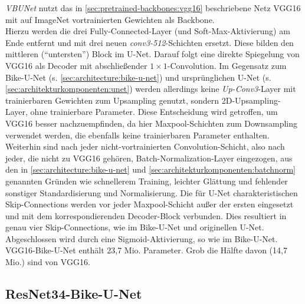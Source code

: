 \textit{\ac{VBUNet}} nutzt das in \autoref{sec:pretrained-backbones:vgg16} beschriebene Netz VGG16 
mit auf ImageNet vortrainierten Gewichten als Backbone. \\
Hierzu werden die drei Fully-Connected-Layer 
(und Soft-Max-Aktivierung) am Ende entfernt und mit drei neuen \textit{conv3-512}-Schichten ersetzt. 
Diese bilden den mittleren (\enquote{untersten}) Block im U-Net. Darauf folgt eine direkte Spiegelung 
von VGG16 als Decoder mit abschließender $1\times 1$-Convolution. Im Gegensatz zum Bike-U-Net (s. \autoref{sec:architecture:bike-u-net}) 
und ursprünglichen U-Net (s. \autoref{sec:architekturkomponenten:unet}) werden allerdings keine 
\textit{Up-Conv3}-Layer mit trainierbaren Gewichten zum Upsampling genutzt, sondern 2D-Upsampling-Layer, 
ohne trainierbare Parameter. Diese Entscheidung wird getroffen, um VGG16 besser nachzuempfinden, 
da hier Maxpool-Schichten zum Downsampling verwendet werden, die ebenfalls keine trainierbaren Parameter enthalten.
Weiterhin sind nach jeder nicht-vortrainierten Convolution-Schicht, also nach jeder, die nicht zu VGG16 gehören, 
Batch-Normalization-Layer eingezogen, aus den in \autoref{sec:architecture:bike-u-net} und \autoref{sec:architekturkomponenten:batchnorm}
genannten Gründen wie schnellerem Training, leichter Glättung und fehlender sonstiger Standardisierung und Normalisierung.
Die für U-Net charakteristischen Skip-Connections werden vor jeder Maxpool-Schicht außer der ersten eingesetzt 
und mit dem korrespondierenden Decoder-Block verbunden. Dies resultiert in genau vier Skip-Connections, 
wie im Bike-U-Net und originellen U-Net. Abgeschlossen wird durch eine Sigmoid-Aktivierung, so wie im Bike-U-Net. \\
VGG16-Bike-U-Net enthält 23,7 Mio. Parameter. Grob die Hälfte davon (14,7 Mio.) sind von VGG16. 

\subsection{ResNet34-Bike-U-Net}

